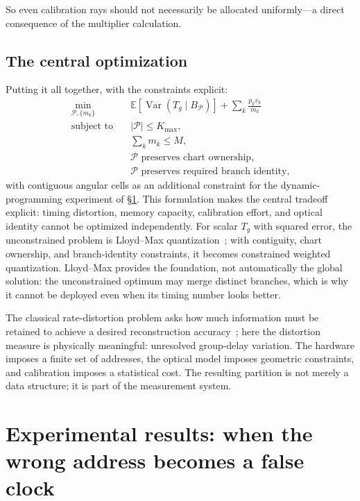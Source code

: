 \documentclass[11pt]{article}
\begin{document}
So even calibration rays should not necessarily be allocated uniformly---a direct
consequence of the multiplier calculation.

\subsection{The central optimization}

Putting it all together, with the constraints explicit:
\begin{equation}
\boxed{\begin{aligned} \min_{\mathcal{P},\{m_k\}} \quad & \mathbb{E}[\operatorname{Var}(T_g \mid B_{\mathcal{P}})] + \sum_k \frac{p_k v_k}{m_k} \\ \text{subject to} \quad & |\mathcal{P}| \le K_{\max}, \\ & \sum_k m_k \le M, \\ & \mathcal{P} \text{ preserves chart ownership,} \\ & \mathcal{P} \text{ preserves required branch identity,} \end{aligned}}
\end{equation}
with contiguous angular cells as an additional constraint for the dynamic-programming
experiment of \S\ref{sec:experiments}. This formulation makes the central tradeoff
explicit: timing distortion, memory capacity, calibration effort, and optical identity
cannot be optimized independently. For scalar $T_g$ with squared error, the unconstrained
problem is Lloyd--Max quantization~\cite{lloyd1982,max1960}; with contiguity, chart
ownership, and branch-identity constraints, it becomes constrained weighted quantization.
Lloyd--Max provides the foundation, not automatically the global solution: the
unconstrained optimum may merge distinct branches, which is why it cannot be deployed
even when its timing number looks better.

The classical rate-distortion problem asks how much information must be retained to
achieve a desired reconstruction accuracy~\cite{shannon1959,coverthomas}; here the distortion measure
is physically meaningful: unresolved group-delay variation. The hardware imposes a finite
set of addresses, the optical model imposes geometric constraints, and calibration
imposes a statistical cost. The resulting partition is not merely a data structure; it is
part of the measurement system.

\section{Experimental results: when the wrong address becomes a false clock}\label{sec:experiments}
\end{document}
